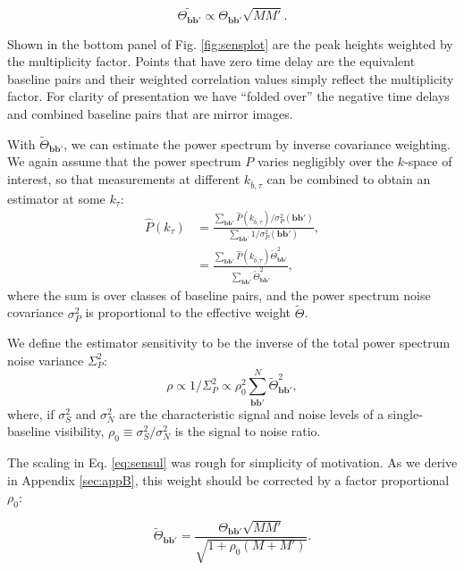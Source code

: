 \documentclass[twocolumn,apj,numberedappendix]{emulateapj}
\renewcommand\[{\begin{equation}}
\renewcommand\]{\end{equation}}
\begin{document}
\begin{equation}
\widetilde{\Theta_{\boldsymbol{bb'}}} \propto \Theta_{\boldsymbol{bb'}}\sqrt{MM'}.\label{eq:sensul}
\end{equation}

Shown in the bottom panel of Fig. \ref{fig:sensplot} are the peak heights weighted
by the multiplicity factor. Points that have zero time delay are the equivalent baseline pairs and their weighted correlation values simply reflect the multiplicity factor. For clarity of presentation we have ``folded over'' the negative time delays and combined baseline pairs that are mirror images.  

With $\widetilde{\Theta}_{\boldsymbol{bb'}}$, we can estimate the power spectrum by inverse covariance weighting. We again assume that the power spectrum $P$ varies negligibly over the $k$-space of interest, so that measurements at different $k_{\bar{b}, \tau}$ can be combined to obtain an estimator at some $k_\tau$:
\begin{equation}
\begin{aligned}
 \hat{P}(k_{\tau}) &= \frac{\sum_{\boldsymbol{bb'}}\hat{P}(k_{\bar{b}, \tau})/\sigma_P^2(\boldsymbol{bb'})}{\sum_{\boldsymbol{bb'}}1/\sigma_P^2(\boldsymbol{bb'})}, \\
 &= \frac{\sum_{\boldsymbol{bb'}}\hat{P}(k_{\bar{b}, \tau})\widetilde{\Theta}_{\boldsymbol{bb'}}^2}{\sum_{\boldsymbol{bb'}}\widetilde{\Theta}_{\boldsymbol{bb'}}^2},
 \end{aligned}
\end{equation}
where the sum is over classes of baseline pairs, and the power spectrum noise covariance $\sigma_P^2$ is proportional to the effective weight $\widetilde{\Theta}$. 


We define the estimator sensitivity to be the inverse of the total power spectrum noise variance $\Sigma_P^2$:
\begin{equation}
\rho \propto 1/\Sigma_P^2 \propto \rho_0^2\sum_{\boldsymbol{bb'}}^N\widetilde{\Theta}^2_{\boldsymbol{bb'}},
\end{equation}
where, if $\sigma_S^2$ and $\sigma_N^2$ are the characteristic signal and noise levels of a single-baseline visibility, $\rho_0\equiv\sigma_S^2/\sigma_N^2$ is the signal to noise ratio. 


The scaling in Eq. \eqref{eq:sensul} was rough for simplicity of motivation. As we derive in Appendix \ref{sec:appB}, this weight should be corrected by a factor proportional $\rho_0$:

\begin{equation}
\label{eq:tildereal}
\widetilde{\Theta}_{\boldsymbol{bb'}} =\frac{\Theta_{\boldsymbol{bb'}}\sqrt{MM'}}{\sqrt{1 + \rho_0 \left(M+M' \right)}}.
\end{equation}
\end{document}
